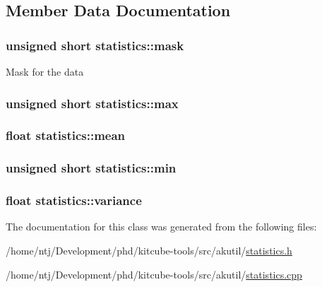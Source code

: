 \subsection{Member Data Documentation}
\hypertarget{classstatistics_a6cef2b7af0c9455ba4d7a3be62920d92}{
\subsubsection[{mask}]{\setlength{\rightskip}{0pt plus 5cm}unsigned short statistics\-::mask\hspace{0.3cm}{\ttfamily [private]}}}\label{classstatistics_a6cef2b7af0c9455ba4d7a3be62920d92}
Mask for the data \hypertarget{classstatistics_a46d65241f719918224650310f2fddecc}{
\subsubsection[{max}]{\setlength{\rightskip}{0pt plus 5cm}unsigned short statistics\-::max}}\label{classstatistics_a46d65241f719918224650310f2fddecc}
\hypertarget{classstatistics_a5eacad512b051c45016ffeed7b35fe21}{
\subsubsection[{mean}]{\setlength{\rightskip}{0pt plus 5cm}float statistics\-::mean}}\label{classstatistics_a5eacad512b051c45016ffeed7b35fe21}
\hypertarget{classstatistics_a9ddfcd7403d9a4ace35979ac3ad59fda}{
\subsubsection[{min}]{\setlength{\rightskip}{0pt plus 5cm}unsigned short statistics\-::min}}\label{classstatistics_a9ddfcd7403d9a4ace35979ac3ad59fda}
\hypertarget{classstatistics_a1397e63632ef6a3b87abfd35eff6485c}{
\subsubsection[{variance}]{\setlength{\rightskip}{0pt plus 5cm}float statistics\-::variance}}\label{classstatistics_a1397e63632ef6a3b87abfd35eff6485c}


The documentation for this class was generated from the following files\-:\begin{DoxyCompactItemize}
\item 
/home/ntj/\-Development/phd/kitcube-\/tools/src/akutil/\hyperlink{statistics_8h}{statistics.\-h}\item 
/home/ntj/\-Development/phd/kitcube-\/tools/src/akutil/\hyperlink{statistics_8cpp}{statistics.\-cpp}\end{DoxyCompactItemize}
